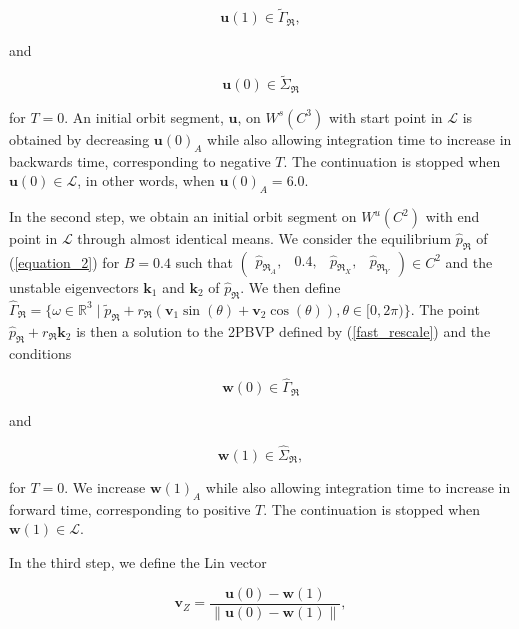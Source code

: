 \documentclass{ws-ijbc}
\begin{document}
\begin{equation}
	\mathbf{u}(1) \in \widetilde{\Gamma}_{\Re},
	\label{top_end}
\end{equation}

and

\begin{equation}
	\mathbf{u}(0) \in \widetilde{\Sigma}_{\Re}
\end{equation}

\noindent
for $T=0$.  An initial orbit segment, $\mathbf{u}$, on $W^{s}(C^3)$ with start point in $\mathscr{L}$ is obtained by decreasing $\mathbf{u}(0)_A$ while also allowing integration time to increase in backwards time, corresponding to negative $T$.  The continuation is stopped when $\mathbf{u}(0) \in \mathscr{L}$, in other words, when $\mathbf{u}(0)_A = 6.0$.

In the second step, we obtain an initial orbit segment on $W^{u}(C^2)$ with end point in $\mathscr{L}$ through almost identical means.  We consider the equilibrium $\hat{p}_{\Re}$ of (\ref{equation_2}) for $B=0.4$ such that $\begin{pmatrix} \hat{p}_{\Re_A}, &0.4, & \hat{p}_{\Re_X}, & \hat{p}_{\Re_Y} \end{pmatrix} \in C^2$ and the unstable eigenvectors $\mathbf{k}_1$ and $\mathbf{k}_2$ of $\hat{p}_{\Re}$.  We then define $\widehat{\Gamma}_{\Re} = \{ \omega \in \mathbb{R}^3  \; | \; \tilde{p}_{\Re} + r_{\Re}(\mathbf{v}_1\sin(\theta) + \mathbf{v}_2\cos(\theta)), \theta \in [0,2\pi) \}$.  The point $\hat{p}_{\Re} + r_{\Re}\mathbf{k}_2$ is then a solution to the 2PBVP defined by (\ref{fast_rescale}) and the conditions

\begin{equation}
	\mathbf{w}(0) \in \widehat{\Gamma}_{\Re}
	\label{bottom_start}
\end{equation}

and

\begin{equation}
	\mathbf{w}(1) \in \widehat{\Sigma}_{\Re},
\end{equation}

\noindent
for $T=0$.  We increase $\mathbf{w}(1)_A$ while also allowing integration time to increase in forward time, corresponding to positive $T$.  The continuation is stopped when $\mathbf{w}(1) \in \mathscr{L}$.

In the third step, we define the Lin vector 

\begin{equation}
	\mathbf{v}_Z = \frac{\mathbf{u}(0) - \mathbf{w}(1)}{\left\lVert \mathbf{u}(0) - \mathbf{w}(1) \right\lVert},
	\label{Lin_vector_singular}
\end{equation}
\end{document}
